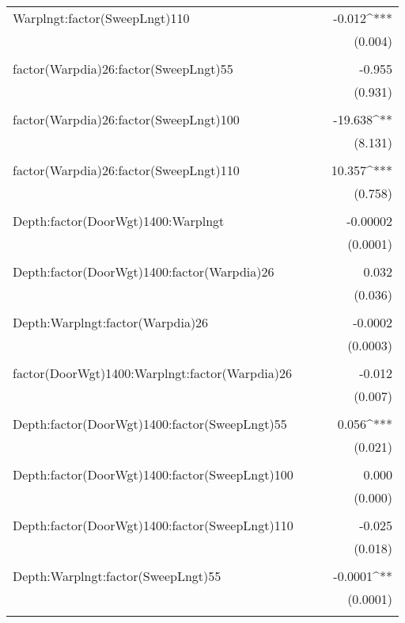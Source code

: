 \documentclass[12pt]{article}\usepackage[]{graphicx}\usepackage[]{color}
\begin{document}
\begin{table}[H]
\begin{tabular}{@{\extracolsep{5pt}}lD{.}{.}{-3} D{.}{.}{-3} D{.}{.}{-3} }
 Warplngt:factor(SweepLngt)110 &  &  & -0.012^{***} \\ 
  &  &  & (0.004) \\ 
  & & & \\ 
 factor(Warpdia)26:factor(SweepLngt)55 &  &  & -0.955 \\ 
  &  &  & (0.931) \\ 
  & & & \\ 
 factor(Warpdia)26:factor(SweepLngt)100 &  &  & -19.638^{**} \\ 
  &  &  & (8.131) \\ 
  & & & \\ 
 factor(Warpdia)26:factor(SweepLngt)110 &  &  & 10.357^{***} \\ 
  &  &  & (0.758) \\ 
  & & & \\ 
 Depth:factor(DoorWgt)1400:Warplngt &  &  & -0.00002 \\ 
  &  &  & (0.0001) \\ 
  & & & \\ 
 Depth:factor(DoorWgt)1400:factor(Warpdia)26 &  &  & 0.032 \\ 
  &  &  & (0.036) \\ 
  & & & \\ 
 Depth:Warplngt:factor(Warpdia)26 &  &  & -0.0002 \\ 
  &  &  & (0.0003) \\ 
  & & & \\ 
 factor(DoorWgt)1400:Warplngt:factor(Warpdia)26 &  &  & -0.012 \\ 
  &  &  & (0.007) \\ 
  & & & \\ 
 Depth:factor(DoorWgt)1400:factor(SweepLngt)55 &  &  & 0.056^{***} \\ 
  &  &  & (0.021) \\ 
  & & & \\ 
 Depth:factor(DoorWgt)1400:factor(SweepLngt)100 &  &  & 0.000 \\ 
  &  &  & (0.000) \\ 
  & & & \\ 
 Depth:factor(DoorWgt)1400:factor(SweepLngt)110 &  &  & -0.025 \\ 
  &  &  & (0.018) \\ 
  & & & \\ 
 Depth:Warplngt:factor(SweepLngt)55 &  &  & -0.0001^{**} \\ 
  &  &  & (0.0001) \\ 
  & & & \\ 

\end{tabular}
\end{table}
\end{document}
